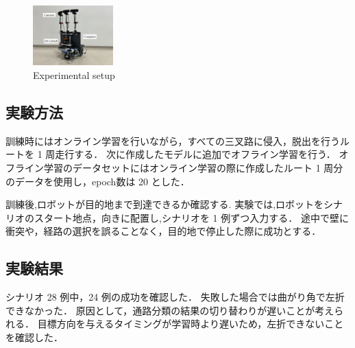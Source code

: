 \documentclass[10pt]{jarticle}
\begin{document}
    \begin{figure}[h]
        \centering
        \includegraphics[width=0.275\textwidth]{./fig/ishiguro/gamma.pdf}
        \caption{Experimental setup}
        \label{fig:gamma}
    \end{figure}
    
    \subsection{実験方法}

    訓練時にはオンライン学習を行いながら，すべての三叉路に侵入，脱出を行うルートを 1 周走行する．
    次に作成したモデルに追加でオフライン学習を行う．
    オフライン学習のデータセットにはオンライン学習の際に作成したルート 1 周分のデータを使用し，epoch数は 20 とした．
   

    訓練後,ロボットが目的地まで到達できるか確認する.
    実験では,ロボットをシナリオのスタート地点，向きに配置し,シナリオを 1 例ずつ入力する．
    途中で壁に衝突や，経路の選択を誤ることなく，目的地で停止した際に成功とする．

    \subsection{実験結果}
    シナリオ 28 例中，24 例の成功を確認した．
    失敗した場合では曲がり角で左折できなかった．
    原因として，通路分類の結果の切り替わりが遅いことが考えられる．
    目標方向を与えるタイミングが学習時より遅いため，左折できないことを確認した．
\end{document}
